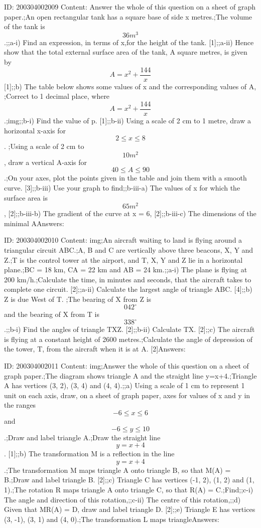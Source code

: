 \documentclass{article}
\begin{document}
ID: 200304002009
Content:
Answer the whole of this question on a sheet of graph paper.;An open rectangular tank has a square base of side x metres.;The volume of the tank is $$36 m^3$$.;;a-i) Find an expression, in terms of x,for the height of the tank.   [1];;a-ii) Hence show that the total external surface area of the tank, A square metres, is given by $$A = x^2 + \frac{144}{x}$$ [1];;b) The table below shows some values of x and the corresponding values of A, ;Correct to 1 decimal place, where $$A = x^2 + \frac{144}{x}$$.;img;;b-i) Find the value of p.   [1];;b-ii) Using a scale of 2 cm to 1 metre, draw a horizontal x-axis for $$2 \leq x \leq 8$$. ;Using a scale of 2 cm to $$10 m^2$$, draw a vertical A-axis for $$40 \leq A \leq 90$$.;On your axes, plot the points given in the table and join them with a smooth curve.   [3];;b-iii) Use your graph to find;;b-iii-a) The values of x for which the surface area is $$65 m^2$$,   [2];;b-iii-b) The gradient of the curve at x = 6,   [2];;b-iii-c) The dimensions of the minimal AAnswers:

ID: 200304002010
Content:
img;An aircraft waiting to land is flying around a triangular circuit ABC.;A, B and C are vertically above three beacons, X, Y and Z.;T is the control tower at the airport, and T, X, Y and Z lie in a horizontal plane.;BC = 18 km, CA = 22 km and AB = 24 km.;;a-i) The plane is flying at 200 km/h.;Calculate the time, in minutes and seconds, that the aircraft takes to complete one circuit.   [2];;a-ii) Calculate the largest angle of triangle ABC.   [4];;b) Z is due West of T. ;The bearing of X from Z is $$042^{\circ}$$ and the bearing of X from T is $$338^{\circ}$$.;;b-i) Find the angles of triangle TXZ.   [2];;b-ii) Calculate TX.   [2];;c) The aircraft is flying at a constant height of 2600 metres.;Calculate the angle of depression of the tower, T, from the aircraft when it is at A.   [2]Answers:

ID: 200304002011
Content:
img;Answer the whole of this question on a sheet of graph paper.;The diagram shows triangle A and the straight line y=x+4.;Triangle A has vertices (3, 2), (3, 4) and (4, 4).;;a) Using a scale of 1 cm to represent 1 unit on each axis, draw, on a sheet of graph paper, axes for values of x and y in the ranges $$-6 \leq x \leq 6$$ and $$-6 \leq y \leq 10$$.;Draw and label triangle A.;Draw the straight line $$y = x + 4$$.   [1];;b) The transformation M is a reflection in the line $$y = x + 4$$.;The transformation M maps triangle A onto triangle B, so that M(A) = B.;Draw and label triangle B.   [2];;c) Triangle C has vertices (-1, 2), (1, 2) and (1, 1).;The rotation R maps triangle A onto triangle C, so that R(A) = C.;Find;;c-i) The angle and direction of this rotation,;;c-ii) The centre of this rotation,;;d) Given that MR(A) = D, draw and label triangle D.   [2];;e) Triangle E has vertices (3, -1), (3, 1) and (4, 0).;The transformation L maps triangleAnswers:
\end{document}
